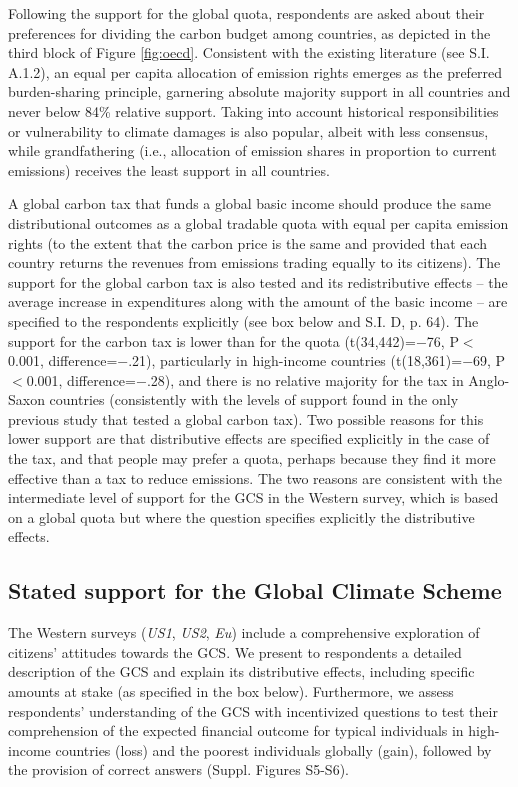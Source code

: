 \documentclass[12pt,english]{article}
\begin{document}
Following the support for the global quota, respondents are asked about their preferences for dividing the carbon budget among countries, as depicted in the third block of Figure \ref{fig:oecd}. Consistent with the existing literature (see S.I. A.1.2), %
an equal per capita allocation of emission rights emerges as the preferred burden-sharing principle, garnering absolute majority support in all countries and never below 84\% relative support. Taking into account historical responsibilities or vulnerability to climate damages is also popular, albeit with less consensus, while grandfathering (i.e., allocation of emission shares in proportion to current emissions) receives the least support in all countries.

A global carbon tax that funds a global basic income should produce the same distributional outcomes as a global tradable quota with equal per capita emission rights (to the extent that the carbon price is the same and provided that each country returns the revenues from emissions trading equally to its citizens). %
The support for the global carbon tax is also tested and its redistributive effects --  the average increase in expenditures along with the amount of the basic income -- are specified to the respondents explicitly  (see box below and S.I. D, p. 64). %
The support for the carbon tax is lower than for the quota (t(34,442)=$-$76, P$<$0.001, difference=$-$.21), particularly in high-income countries (t(18,361)=$-$69, P$<$0.001, difference=$-$.28), and there is no relative majority for the tax in Anglo-Saxon countries (consistently with the levels of support found in the only previous study that tested a global carbon tax\cite{carattini_how_2019}). %
Two possible reasons for this lower support are that distributive effects are specified explicitly in the case of the tax, and that people may prefer a quota, perhaps because they find it more effective than a tax to reduce emissions. The two reasons are consistent with the intermediate level of support for the GCS in the Western survey, which is based on a global quota but where the question specifies explicitly the distributive effects. %

\subsection{Stated support for the Global Climate Scheme}\label{subsec:gcs_stated_support}

The Western surveys (\textit{US1}, \textit{US2}, \textit{Eu}) include a comprehensive exploration of citizens' attitudes towards the GCS. We present to respondents a detailed description of the GCS and explain its distributive effects, including specific amounts at stake (as specified in the box below). Furthermore, we assess respondents' understanding of the GCS with incentivized questions to test their comprehension of the expected financial outcome for typical individuals in high-income countries (loss) and the poorest individuals globally (gain), followed by the provision of correct answers (Suppl. Figures S5-S6). %
\end{document}
